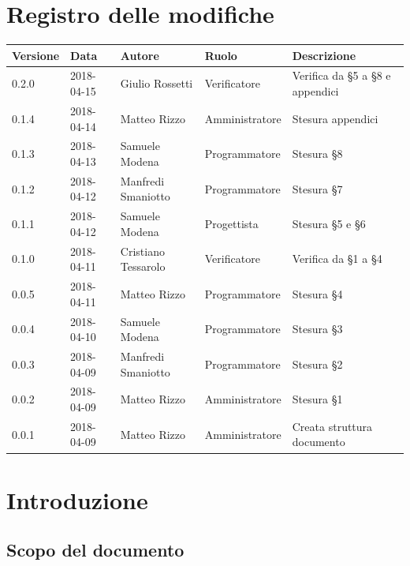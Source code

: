 \documentclass[openany,12pt,a4paper]{report}
\begin{document}
	\chapter*{Registro delle modifiche}
	\setlength\LTleft{-22mm}
	\begin{longtable}{|p{20mm}|p{20mm}|p{40mm}|p{30mm}|p{50mm}|}
		\hline
		\textbf{Versione} & \textbf{Data} & \textbf{Autore} & \textbf{Ruolo} & \textbf{Descrizione} \\
		
		\hline 0.2.0 & 2018-04-15 & Giulio Rossetti & Verificatore & Verifica da §5 a §8 e appendici \\
		\hline 0.1.4 & 2018-04-14 & Matteo Rizzo & Amministratore & Stesura appendici \\
		\hline 0.1.3 & 2018-04-13 & Samuele Modena & Programmatore & Stesura §8 \\
		\hline 0.1.2 & 2018-04-12 & Manfredi Smaniotto & Programmatore & Stesura §7 \\		
		\hline 0.1.1 & 2018-04-12 & Samuele Modena & Progettista & Stesura §5 e §6 \\
		\hline 0.1.0 & 2018-04-11 & Cristiano Tessarolo & Verificatore & Verifica da §1 a §4 \\
		\hline 0.0.5 & 2018-04-11 & Matteo Rizzo & Programmatore & Stesura §4 \\	
		\hline 0.0.4 & 2018-04-10 & Samuele Modena & Programmatore & Stesura §3 \\
		\hline 0.0.3 & 2018-04-09 & Manfredi Smaniotto & Programmatore & Stesura §2 \\
		\hline 0.0.2 & 2018-04-09 & Matteo Rizzo & Amministratore & Stesura §1 \\
		\hline 0.0.1 & 2018-04-09 & Matteo Rizzo & Amministratore & Creata struttura documento \\
		\hline
		
	\end{longtable}
	
	
	\tableofcontents
	
	
	\chapter{Introduzione}
	
	\section{Scopo del documento}
	
\end{document}
